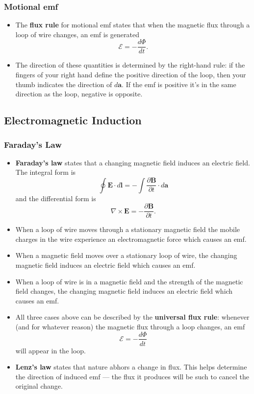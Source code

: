 \documentclass{article}
\renewcommand{\vec}[1]{\boldsymbol{\mathbf{#1}}}
\begin{document}
\subsubsection{Motional emf}

\begin{itemize}
  \item The \textbf{flux rule} for motional emf states that when the magnetic flux through a loop of wire changes, an emf is generated \[\mathcal{E} = -\frac{d \Phi}{d t}.\]

  \item The direction of these quantities is determined by the right-hand rule: if the fingers of your right hand define the positive direction of the loop, then your thumb indicates the direction of $d \vec{a}$. If the emf is positive it's in the same direction as the loop, negative is opposite.
\end{itemize}

\subsection{Electromagnetic Induction}

\subsubsection{Faraday's Law}

\begin{itemize}
  \item \textbf{Faraday's law} states that a changing magnetic field induces an electric field. The integral form is \[\oint \vec{E} \cdot d \vec{l} = - \int \frac{\partial \vec{B}}{\partial t} \cdot d \vec{a}\] and the differential form is \[\nabla \times \vec{E} = -\frac{\partial \vec{B}}{\partial t}.\]

  \item When a loop of wire moves through a stationary magnetic field the mobile charges in the wire experience an electromagnetic force which causes an emf.

  \item When a magnetic field moves over a stationary loop of wire, the changing magnetic field induces an electric field which causes an emf.

  \item When a loop of wire is in a magnetic field and the strength of the magnetic field changes, the changing magnetic field induces an electric field which causes an emf.

  \item All three cases above can be described by the \textbf{universal flux rule}: whenever (and for whatever reason) the magnetic flux through a loop changes, an emf \[\mathcal{E} = -\frac{d \Phi}{d t}\] will appear in the loop.

  \item \textbf{Lenz's law} states that nature abhors a change in flux. This helps determine the direction of induced emf — the flux it produces will be such to cancel the original change.
\end{itemize}
\end{document}
